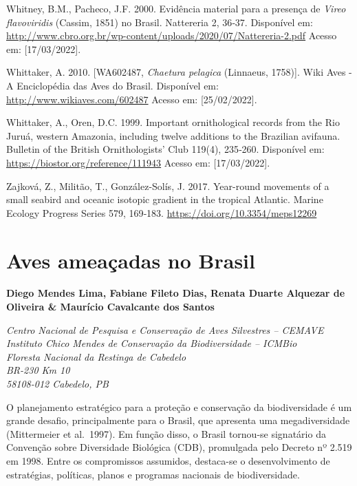 \documentclass[
  oneside]{scrbook}
\begin{document}
Whitney, B.M., Pacheco, J.F. 2000. Evidência material para a presença de \emph{Vireo flavoviridis} (Cassim, 1851) no Brasil. Nattereria 2, 36‑37. Disponível em: \url{http://www.cbro.org.br/wp-content/uploads/2020/07/Nattereria-2.pdf} Acesso em: {[}17/03/2022{]}.

Whittaker, A. 2010. {[}WA602487, \emph{Chaetura pelagica} (Linnaeus, 1758){]}. Wiki Aves - A Enciclopédia das Aves do Brasil. Disponível em: \url{http://www.wikiaves.com/602487} Acesso em: {[}25/02/2022{]}.

Whittaker, A., Oren, D.C. 1999. Important ornithological records from the Rio Juruá, western Amazonia, including twelve additions to the Brazilian avifauna. Bulletin of the British Ornithologists' Club 119(4), 235‑260. Disponível em: \url{https://biostor.org/reference/111943} Acesso em: {[}17/03/2022{]}.

Zajková, Z., Militão, T., González-Solís, J. 2017. Year-round movements of a small seabird and oceanic isotopic gradient in the tropical Atlantic. Marine Ecology Progress Series 579, 169‑183. \url{https://doi.org/10.3354/meps12269}

\hypertarget{cap3}{%
\chapter{Aves ameaçadas no Brasil}\label{cap3}}

\pagestyle{headings}

\textbf{Diego Mendes Lima, Fabiane Fileto Dias, Renata Duarte Alquezar de Oliveira \& Maurício Cavalcante dos Santos}

\emph{Centro Nacional de Pesquisa e Conservação de Aves Silvestres -- CEMAVE}\\
\emph{Instituto Chico Mendes de Conservação da Biodiversidade -- ICMBio}\\
\emph{Floresta Nacional da Restinga de Cabedelo}\\
\emph{BR-230 Km 10}\\
\emph{58108-012 Cabedelo, PB}

O planejamento estratégico para a proteção e conservação da biodiversidade é um grande desafio, principalmente para o Brasil, que apresenta uma megadiversidade (Mittermeier et al.~1997). Em função disso, o Brasil tornou-se signatário da Convenção sobre Diversidade Biológica (CDB), promulgada pelo Decreto nº 2.519 em 1998. Entre os compromissos assumidos, destaca-se o desenvolvimento de estratégias, políticas, planos e programas nacionais de biodiversidade.
\end{document}
